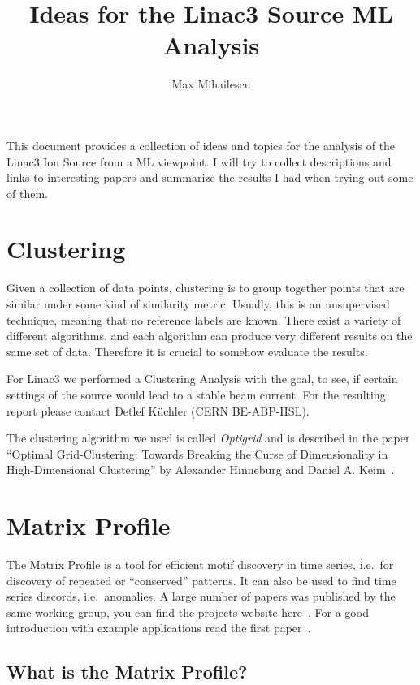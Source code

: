 \documentclass[12pt,a4paper]{article}
\title{Ideas for the Linac3 Source ML Analysis}
\author{Max Mihailescu}
\date{}
\begin{document}
\maketitle

This document provides a collection of ideas and topics for the analysis
of the Linac3 Ion Source from a ML viewpoint. I will try to collect
descriptions and links to interesting papers and summarize the results I
had when trying out some of them.

\hypertarget{clustering}{%
\section{Clustering}\label{clustering}}

Given a collection of data points, clustering is to group together
points that are similar under some kind of similarity metric. Usually,
this is an unsupervised technique, meaning that no reference labels are
known. There exist a variety of different algorithms, and each algorithm
can produce very different results on the same set of data. Therefore it
is crucial to somehow evaluate the results.

For Linac3 we performed a Clustering Analysis with the goal, to see, if
certain settings of the source would lead to a stable beam current. For
the resulting report please contact Detlef Küchler (CERN BE-ABP-HSL).

The clustering algorithm we used is called \emph{Optigrid} and is
described in the paper ``Optimal Grid-Clustering: Towards Breaking the
Curse of Dimensionality in High-Dimensional Clustering'' by Alexander
Hinneburg and Daniel A. Keim~\cite{Hinneburg:OptimalGridClustering}.

\hypertarget{matrix-profile}{%
\section{Matrix Profile}\label{matrix-profile}}

The Matrix Profile is a tool for efficient motif discovery in time
series, i.e.~for discovery of repeated or ``conserved'' patterns. It can
also be used to find time series discords, i.e.~anomalies. A large
number of papers was published by the same working group, you can find
the projects website here~\cite{Keogh:UCRMatrixProfile}. For a good introduction with
example applications read the first paper~\cite{Yeh:MatrixProfileI}.

\hypertarget{what-is-the-matrix-profile}{%
\subsection{What is the Matrix Profile?}\label{what-is-the-matrix-profile}}
\end{document}
